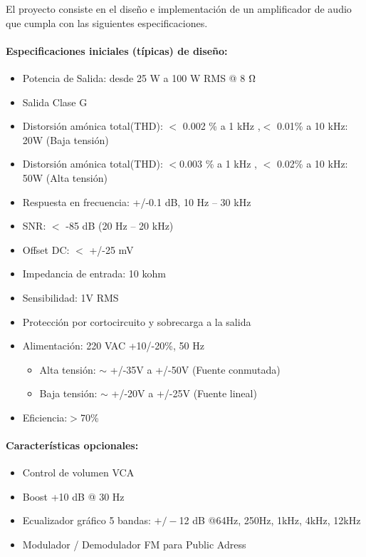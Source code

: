 \bigskip
El proyecto consiste en el diseño e implementación de un amplificador de audio que cumpla con las siguientes especificaciones.

\medskip 
\paragraph{Especificaciones iniciales (típicas) de diseño:}

\begin{itemize}
\item Potencia de Salida: desde 25 W a 100 W RMS @ 8 $\ohm$

\item Salida Clase G

\item  Distorsión amónica total(THD): $<$ 0.002 \% a 1 kHz ,$<$ 0.01\% a 10 kHz: 20W (Baja tensión)
\item  Distorsión amónica total(THD): $<$0.003 \% a 1 kHz , $<$ 0.02\% a 10 kHz: 50W (Alta tensión)
\item Respuesta en frecuencia: +/-0.1 dB, 10 Hz – 30 kHz
\item SNR: $<$ -85 dB (20 Hz – 20 kHz)
\item Offset DC: $<$ +/-25 mV
\item Impedancia de entrada: 10 kohm
\item Sensibilidad: 1V RMS
\item Protección por cortocircuito y sobrecarga a la salida
\item Alimentación: 220 VAC +10/-20\%, 50 Hz

\begin{itemize}
    \item Alta tensión: $\sim$ +/-35V a +/-50V (Fuente conmutada)
    \item Baja tensión: $\sim$ +/-20V a +/-25V (Fuente lineal)
\end{itemize}
    
\item  Eficiencia:$>$70\%

\end{itemize}
\medskip 
\paragraph*{Características opcionales:}

\begin{itemize}
\item  Control de volumen VCA
\item  Boost +10 dB @ 30 Hz
\item  Ecualizador gráfico 5 bandas: $+/-$12 dB @64Hz, 250Hz, 1kHz, 4kHz, 12kHz
\item  Modulador / Demodulador FM para Public Adress

\end{itemize}